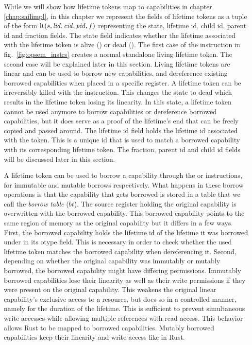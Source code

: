 While we will show how lifetime tokens map to capabilities in chapter \ref{chap:sailimpl}, in this chapter we represent the fields of lifetime tokens as a tuple of the form $\mathrm{lt}(s,\mathit{lid},\mathit{cid},\mathit{pid},f)$ representing the state, lifetime id, child id, parent id and fraction fields.
The state field indicates whether the lifetime associated with the lifetime token is alive () or dead ().
The first case of the  instruction in fig.\ \ref{fig:opsem_instrs} creates a normal standalone living lifetime token.
The second case will be explained later in this section.
Living lifetime tokens are linear and can be used to borrow new capabilities, and dereference existing borrowed capabilities when placed in a specific register.
A lifetime token can be irreversibly killed with the  instruction.
This changes the state to dead which results in the lifetime token losing its linearity.
In this state, a lifetime token cannot be used anymore to borrow capabilities or dereference borrowed capabilities, but it does serve as a proof of the lifetime's end that can be freely copied and passed around.
The lifetime id field holds the lifetime id associated with the token.
This is a unique id that is used to match a borrowed capability with its corresponding lifetime token.
The fraction, parent id and child id fields will be discussed later in this section.

A lifetime token can be used to borrow a capability through the  or  instructions, for immutable and mutable borrows respectively.
What happens in these borrow operations is that the capability that gets borrowed is stored in a table that we call the \emph{borrow table} ($bt$).
The source register holding the original capability is overwritten with the borrowed capability.
This borrowed capability points to the same region of memory as the original capability but it differs in a few ways.
First, the borrowed capability holds the lifetime id of the lifetime it was borrowed under in its otype field.
This is necessary in order to check whether the used lifetime token matches the borrowed capability when dereferencing it.
Second, depending on whether the original capability was immutably or mutably borrowed, the borrowed capability might have differing permissions.
Immutably borrowed capabilities lose their linearity as well as their write permissions if they were present on the original capability.
This weakens the original linear capability's exclusive access to a resource, but does so in a controlled manner, namely for the duration of the lifetime.
This is sufficient to prevent simultaneous write accesses while allowing multiple references with read access.
This behavior allows Rust to be mapped to borrowed capabilities.
Mutably borrowed capabilities keep their linearity and write access like in Rust.

